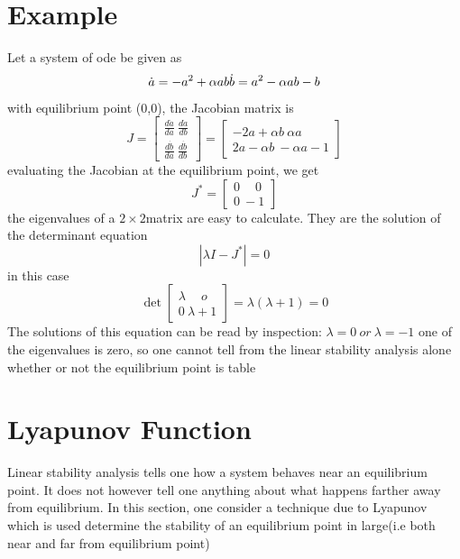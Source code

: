\documentclass[a4paper,12pt]{report}
\numberwithin{equation}{section}
\begin{document}
\section*{Example}
Let a system of ode be given as 
\begin{equation*}
\dot{a}= -a^2 + \alpha ab\\
\dot{b}=a^2 - \alpha ab - b
\end{equation*}
with equilibrium point (0,0), the Jacobian matrix is 
\begin{equation*}
J = \left[ \begin{matrix}
\frac{d\dot{a}}{da} \ \frac{d\dot{a}}{db} \\ 
\frac{d\dot{b}}{da} \ \frac{d\dot{b}}{db}
\end{matrix}\right] = \left[ \begin{matrix}
-2a+\alpha b \ \alpha a \\
2a-\alpha b \ -\alpha a - 1
\end{matrix}\right]
\end{equation*}
evaluating the Jacobian at the equilibrium point, we get 
\begin{equation*}
J^* = \left[ \begin{matrix}
0 \ \quad 0 \\
0 \ -1
\end{matrix} \right]
\end{equation*} 
the eigenvalues of a $2 \times 2$matrix are easy to calculate. They are the solution of the determinant equation
\begin{equation*}
|\lambda I - J^*|= 0
\end{equation*} 
in this case \begin{equation}
\det\left[ \begin{matrix}
\lambda \ \quad o \\
0 \ \lambda+1
\end{matrix}\right]= \lambda(\lambda+1)=0
\end{equation} 
The solutions of this equation can be read by inspection: $ \lambda=0 \ or \ \lambda= -1$ one of the eigenvalues is zero, so one cannot tell from the linear stability analysis alone whether or not the equilibrium point is table 
\section{Lyapunov Function }
Linear stability analysis tells one how a system behaves near an equilibrium point. It does not however tell one anything about what happens farther away from equilibrium. In this section, one consider a technique due to Lyapunov which is used determine the stability of an equilibrium point in large(i.e both near and far from equilibrium point)
\end{document}
